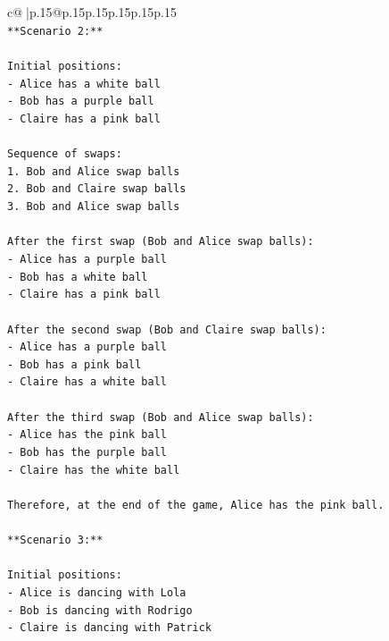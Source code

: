 \documentclass{article}
\begin{document}
{\begin{supertabular}{c@{$\;$}|p{.15\linewidth}@{}p{.15\linewidth}p{.15\linewidth}p{.15\linewidth}p{.15\linewidth}p{.15\linewidth}}
{{{\\ 
\texttt{**Scenario 2:**} \\
\\ 
\texttt{Initial positions:} \\
\texttt{{-} Alice has a white ball} \\
\texttt{{-} Bob has a purple ball} \\
\texttt{{-} Claire has a pink ball} \\
\\ 
\texttt{Sequence of swaps:} \\
\texttt{1. Bob and Alice swap balls} \\
\texttt{2. Bob and Claire swap balls} \\
\texttt{3. Bob and Alice swap balls} \\
\\ 
\texttt{After the first swap (Bob and Alice swap balls):} \\
\texttt{{-} Alice has a purple ball} \\
\texttt{{-} Bob has a white ball} \\
\texttt{{-} Claire has a pink ball} \\
\\ 
\texttt{After the second swap (Bob and Claire swap balls):} \\
\texttt{{-} Alice has a purple ball} \\
\texttt{{-} Bob has a pink ball} \\
\texttt{{-} Claire has a white ball} \\
\\ 
\texttt{After the third swap (Bob and Alice swap balls):} \\
\texttt{{-} Alice has the pink ball} \\
\texttt{{-} Bob has the purple ball} \\
\texttt{{-} Claire has the white ball} \\
\\ 
\texttt{Therefore, at the end of the game, Alice has the pink ball.} \\
\\ 
\texttt{**Scenario 3:**} \\
\\ 
\texttt{Initial positions:} \\
\texttt{{-} Alice is dancing with Lola} \\
\texttt{{-} Bob is dancing with Rodrigo} \\
\texttt{{-} Claire is dancing with Patrick} \\
}}}
\end{supertabular}}
\end{document}
